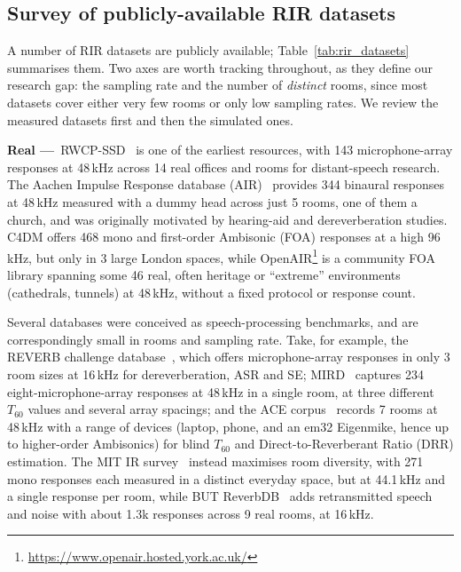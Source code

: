 \subsection{Survey of publicly-available RIR datasets}
\label{sec:bg_rir_datasets}

A number of \acrshort{RIR} datasets are publicly available; Table~\ref{tab:rir_datasets}
summarises them. Two axes are worth tracking throughout, as they define our
research gap: the sampling rate and the number of \emph{distinct} rooms, since
most datasets cover either very few rooms or only low sampling rates. We
review the measured datasets first and then the simulated ones.

\textbf{Real ---}~RWCP-SSD~\citep{nakamura2000acoustical} is one of the earliest resources, with 143
microphone-array responses at 48\,kHz across 14 real offices and rooms for
distant-speech research. The Aachen Impulse Response database
(AIR)~\citep{jeub2009binaural} provides 344 binaural responses at 48\,kHz
measured with a dummy head across just 5 rooms, one of them a church, and was
originally motivated by hearing-aid and dereverberation studies. C4DM
\citep{stewart2010database} offers 468 mono and first-order Ambisonic
(\acrshort{FOA}) responses at a high 96\,kHz, but only in 3 large London
spaces, while OpenAIR\footnote{\url{https://www.openair.hosted.york.ac.uk/}}
is a community \acrshort{FOA} library spanning some 46 real, often heritage or
``extreme'' environments (cathedrals, tunnels) at 48\,kHz, without a fixed
protocol or response count.

Several databases were conceived as speech-processing benchmarks, and are
correspondingly small in rooms and sampling rate. Take, for example, the REVERB
challenge database~\citep{kinoshita2013reverb}, which offers microphone-array responses in
only 3 room sizes at 16\,kHz for dereverberation, \acrshort{ASR} and
\acrshort{SE}; MIRD~\citep{hadad2014multichannel} captures 234
eight-microphone-array responses at 48\,kHz in a single room, at three
different $T_{60}$ values and several array spacings; and the ACE
corpus~\citep{eaton2015ace} records 7 rooms at 48\,kHz with a range of devices
(laptop, phone, and an em32 Eigenmike, hence up to higher-order Ambisonics)
for blind $T_{60}$ and Direct-to-Reverberant Ratio (DRR) estimation. The MIT IR
survey~\citep{traer2016statistics} instead maximises room diversity, with 271
mono responses each measured in a distinct everyday space, but at 44.1\,kHz
and a single response per room, while BUT ReverbDB~\citep{szoke2019building}
adds retransmitted speech and noise with about 1.3k responses across 9 real
rooms, at 16\,kHz.

